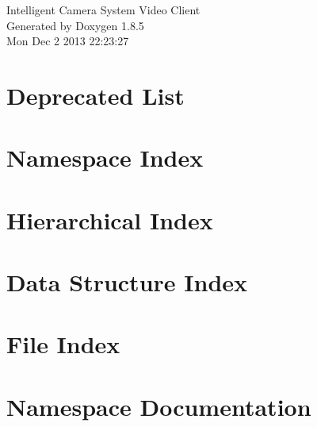 \documentclass[twoside]{book}
\newcommand{\clearemptydoublepage}{%
  \newpage{\pagestyle{empty}\cleardoublepage}%
}
\begin{document}
\hypersetup{pageanchor=false}
\begin{titlepage}
\vspace*{7cm}
\begin{center}%
{\Large Intelligent Camera System Video Client }\\
\vspace*{1cm}
{\large Generated by Doxygen 1.8.5}\\
\vspace*{0.5cm}
{\small Mon Dec 2 2013 22:23:27}\\
\end{center}
\end{titlepage}
\clearemptydoublepage
\tableofcontents
\clearemptydoublepage
{}
\hypersetup{pageanchor=true}

\chapter{Deprecated List}
\label{deprecated}
\hypertarget{deprecated}{}

\chapter{Namespace Index}

\chapter{Hierarchical Index}

\chapter{Data Structure Index}

\chapter{File Index}

\chapter{Namespace Documentation}



\end{document}
